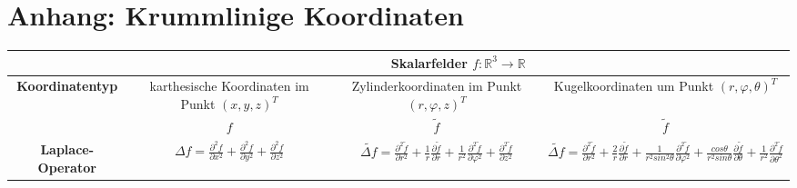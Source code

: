 \documentclass[6pt,a4paper]{scrartcl}
\begin{document}
\section{Anhang: Krummlinige Koordinaten}
\begin{center}
    \begin{tabular}{|c|c|c|c|}
        \hline
                                  & \multicolumn{3}{c|}{\textbf{Skalarfelder $f:\mathbb{R}^3\rightarrow\mathbb{R}$}}                                                                                                                                                                                                                                                                                                                                                                                                                                                                                                                                                                             \\
        \hline
        \textbf{Koordinatentyp}   & karthesische Koordinaten im Punkt $(x,y,z)^T$                                                                 & Zylinderkoordinaten im Punkt $(r,\varphi,z)^T$                                                                                                                                                                      & Kugelkoordinaten um Punkt $(r,\varphi,\theta)^T$                                                                                                                                                                                                                                                                       \\
        \hline
                                  & $f$                                                                                                           & $\tilde{f}$                                                                                                                                                                                                         & $\tilde{f}$                                                                                                                                                                                                                                                                                                            \\
        \hline
        \textbf{Laplace-Operator} & $\Delta f=\frac{\partial^2f}{\partial x^2}+\frac{\partial^2f}{\partial y^2}+\frac{\partial^2f}{\partial z^2}$ & $\widetilde{\Delta f}=\frac{\partial^2\tilde{f}}{\partial r^2}+\frac{1}{r}\frac{\partial\tilde{f}}{\partial r}+\frac{1}{r^2}\frac{\partial^2\tilde{f}}{\partial\varphi^2}+\frac{\partial^2\tilde{f}}{\partial z^2}$ & $\widetilde{\Delta f}=\frac{\partial^2\tilde{f}}{\partial r^2}+\frac{2}{r}\frac{\partial\tilde{f}}{\partial r}+\frac{1}{r^2sin^2\theta}\frac{\partial^2\tilde{f}}{\partial\varphi^2}+\frac{cos\theta}{r^2sin\theta}\frac{\partial\tilde{f}}{\partial\theta}+\frac{1}{r^2}\frac{\partial^2\tilde{f}}{\partial\theta^2}$ \\

\end{tabular}
\end{center}
\end{document}
